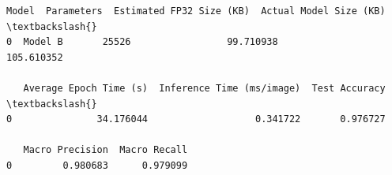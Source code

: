 \documentclass[11pt]{article}
\makeatletter
\newcommand{\boxspacing}{\kern\kvtcb@left@rule\kern\kvtcb@boxsep}
\newcommand{\prompt}[4]{
        {\ttfamily\llap{{\color{#2}[#3]:\hspace{3pt}#4}}\vspace{-\baselineskip}}
    }
\makeatother
\begin{document}
            \begin{tcolorbox}[breakable, size=fbox, boxrule=.5pt, pad at break*=1mm, opacityfill=0]
\prompt{Out}{outcolor}{36}{\boxspacing}
\begin{Verbatim}[commandchars=\\\{\}]
     Model  Parameters  Estimated FP32 Size (KB)  Actual Model Size (KB)  \textbackslash{}
0  Model B       25526                 99.710938              105.610352

   Average Epoch Time (s)  Inference Time (ms/image)  Test Accuracy  \textbackslash{}
0               34.176044                   0.341722       0.976727

   Macro Precision  Macro Recall
0         0.980683      0.979099
\end{Verbatim}
\end{tcolorbox}
        

    
    
    
\end{document}
